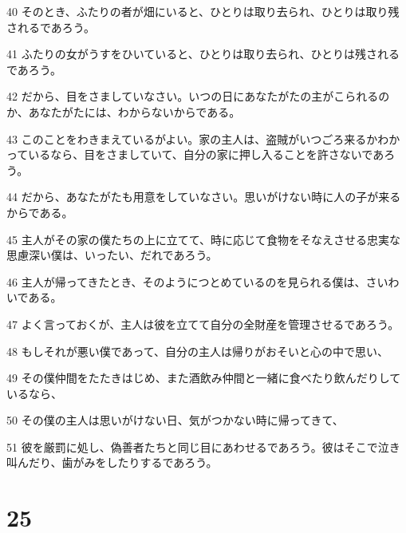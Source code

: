\par 40 そのとき、ふたりの者が畑にいると、ひとりは取り去られ、ひとりは取り残されるであろう。
\par 41 ふたりの女がうすをひいていると、ひとりは取り去られ、ひとりは残されるであろう。
\par 42 だから、目をさましていなさい。いつの日にあなたがたの主がこられるのか、あなたがたには、わからないからである。
\par 43 このことをわきまえているがよい。家の主人は、盗賊がいつごろ来るかわかっているなら、目をさましていて、自分の家に押し入ることを許さないであろう。
\par 44 だから、あなたがたも用意をしていなさい。思いがけない時に人の子が来るからである。
\par 45 主人がその家の僕たちの上に立てて、時に応じて食物をそなえさせる忠実な思慮深い僕は、いったい、だれであろう。
\par 46 主人が帰ってきたとき、そのようにつとめているのを見られる僕は、さいわいである。
\par 47 よく言っておくが、主人は彼を立てて自分の全財産を管理させるであろう。
\par 48 もしそれが悪い僕であって、自分の主人は帰りがおそいと心の中で思い、
\par 49 その僕仲間をたたきはじめ、また酒飲み仲間と一緒に食べたり飲んだりしているなら、
\par 50 その僕の主人は思いがけない日、気がつかない時に帰ってきて、
\par 51 彼を厳罰に処し、偽善者たちと同じ目にあわせるであろう。彼はそこで泣き叫んだり、歯がみをしたりするであろう。

\chapter{25}

